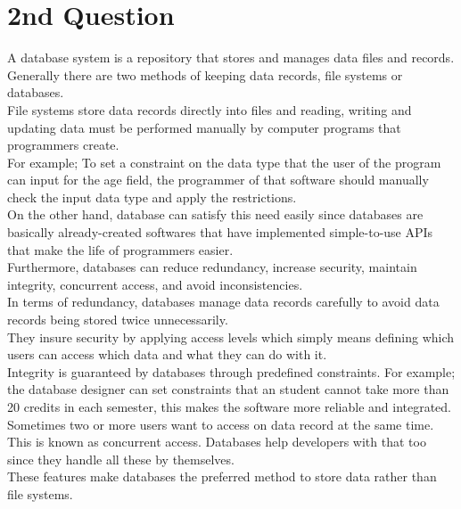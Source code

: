 \documentclass[twocolumn,a4paper, 10pt]{article}
\begin{document}
    \section*{2nd Question}
        A database system is a repository that stores and manages data files and records. \\ 
        Generally there are two methods of keeping data records, file systems or databases. \\
        File systems store data records directly into files and reading, writing and updating data 
        must be performed manually by computer programs that programmers create. \\ For example; 
        To set a constraint on the data type that the user of the program can input for the age field,
        the programmer of that software should manually check the input data type and apply the restrictions. \\
        On the other hand, database can satisfy this need easily since databases are basically already-created 
        softwares that have implemented simple-to-use APIs that make the life of programmers easier. \\ 
        Furthermore, databases can reduce redundancy, increase security, maintain integrity, concurrent access, and avoid inconsistencies. \\
        In terms of redundancy, databases manage data records carefully to avoid data records being stored twice unnecessarily. \\
        They insure security by applying access levels which simply means defining which users can access which data and what they can 
        do with it. \\ 
        Integrity is guaranteed by databases through predefined constraints. For example; the database designer can set constraints 
        that an student cannot take more than 20 credits in each semester, this makes the software more reliable and integrated. \\ 
        Sometimes two or more users want to access on data record at the same time. This is known as concurrent access. 
        Databases help developers with that too since they handle all these by themselves. \\ 
        These features make databases the preferred method to store data rather than file systems.
\end{document}
